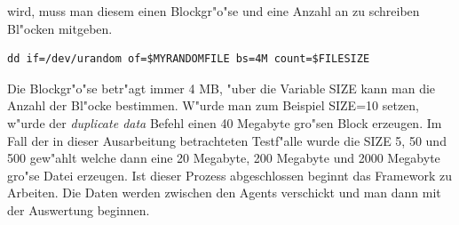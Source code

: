 wird, muss man diesem einen Blockgr"o"se und eine Anzahl an zu schreiben Bl"ocken mitgeben. %
\begin{verbatim}
dd if=/dev/urandom of=$MYRANDOMFILE bs=4M count=$FILESIZE 
\end{verbatim}
Die Blockgr"o"se betr"agt immer 4 MB, "uber die Variable SIZE kann man die Anzahl der Bl"ocke %
bestimmen. W"urde man zum Beispiel SIZE=10 setzen, w"urde der \emph{duplicate data} Befehl einen 40 Megabyte gro"sen Block erzeugen. %
Im Fall der in dieser Ausarbeitung betrachteten Testf"alle wurde die SIZE 5, 50 und 500 gew"ahlt welche %
dann eine 20 Megabyte, 200 Megabyte und 2000 Megabyte gro"se Datei erzeugen. %
Ist dieser Prozess abgeschlossen beginnt das Framework zu Arbeiten. Die Daten %
werden zwischen den Agents verschickt und man dann mit der Auswertung beginnen. %


